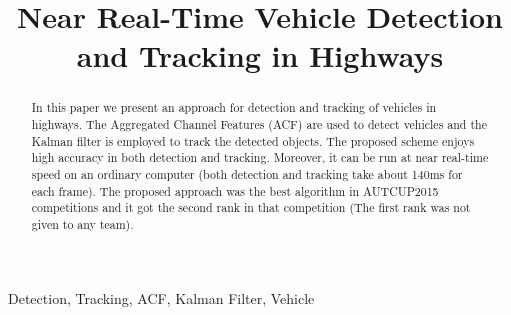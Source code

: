\documentclass[conference]{IEEEtran}
\begin{document}
%
\title{Near Real-Time Vehicle Detection and Tracking in Highways}


\author{
\and
{}
\and
{}
}



\maketitle


\begin{abstract}
In this paper we present an approach for detection and tracking of vehicles in highways. The Aggregated Channel Features (ACF) are used to detect vehicles and the Kalman filter is employed to track the detected objects. The proposed scheme enjoys high accuracy in both detection and tracking. Moreover, it can be run at near real-time speed on an ordinary computer (both detection and tracking take about 140ms for each frame). The proposed approach was the best algorithm in AUTCUP2015 competitions and it got the second rank in that competition (The first rank was not given to any team).
\end{abstract}






%
\begin{IEEEkeywords}
	Detection, Tracking, ACF, Kalman Filter, Vehicle
\end{IEEEkeywords}
\end{document}

